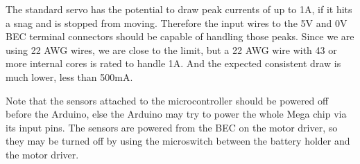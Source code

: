 The standard servo has the potential to draw peak currents of up to 1A, if it hits a snag and is stopped from moving. Therefore the input wires to the 5V and 0V BEC terminal connectors should be capable of handling those peaks. Since we are using 22 AWG wires, we are close to the limit, but a 22 AWG wire with 43 or more internal cores is rated to handle 1A. And the expected consistent draw is much lower, less than 500mA. 

Note that the sensors attached to the microcontroller should be powered off before the Arduino, else the Arduino may try to power the whole Mega chip via its input pins. The sensors are powered from the BEC on the motor driver, so they may be turned off by using the microswitch between the battery holder and the motor driver.

